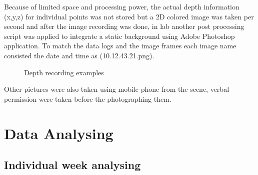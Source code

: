 \begin{enumerate}
Because of limited space and processing power, the actual depth information (x,y,z) for individual points was not stored but a 2D colored image was taken per second and after the image recording was done, in lab another post processing script was applied to integrate a static background using Adobe Photoshop application. To match the data logs and the image frames each image name consisted the date and time as (10.12.43.21.png).

\begin{figure}[!htb]
    \centering
    \caption{Depth recording examples}%
    \label{fig:DepthRecordedImages}%
\end{figure}

\end{enumerate}

Other pictures were also taken using mobile phone from the scene, verbal permission were taken before the photographing them.



\section{Data Analysing}


\subsection{Individual week analysing}


